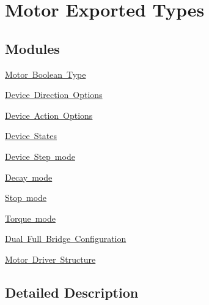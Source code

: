 \hypertarget{group___motor___exported___types}{}\section{Motor Exported Types}
\label{group___motor___exported___types}
\subsection*{Modules}
\begin{DoxyCompactItemize}
\item 
\mbox{\hyperlink{group___motor___boolean___type}{Motor Boolean Type}}
\item 
\mbox{\hyperlink{group___device___direction___options}{Device Direction Options}}
\item 
\mbox{\hyperlink{group___device___action___options}{Device Action Options}}
\item 
\mbox{\hyperlink{group___device___states}{Device States}}
\item 
\mbox{\hyperlink{group___device___step__mode}{Device Step mode}}
\item 
\mbox{\hyperlink{group___decay__mode}{Decay mode}}
\item 
\mbox{\hyperlink{group___stop__mode}{Stop mode}}
\item 
\mbox{\hyperlink{group___torque__mode}{Torque mode}}
\item 
\mbox{\hyperlink{group___dual___full___bridge___configuration}{Dual Full Bridge Configuration}}
\item 
\mbox{\hyperlink{group___motor___driver___structure}{Motor Driver Structure}}
\end{DoxyCompactItemize}


\subsection{Detailed Description}
